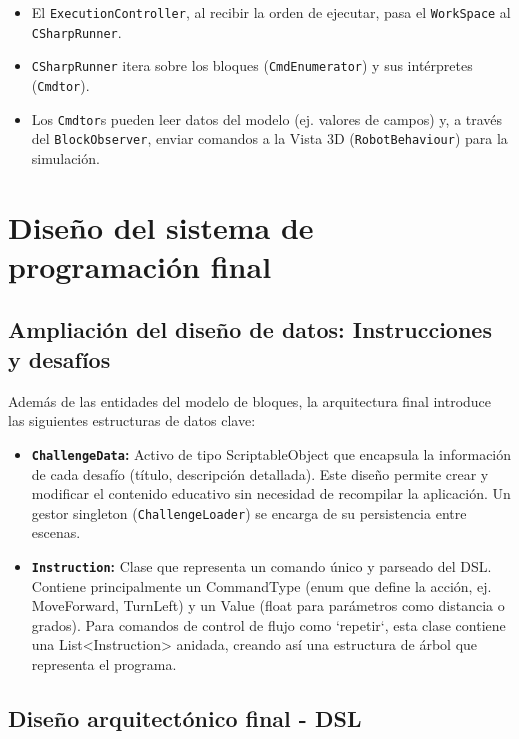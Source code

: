 \begin{enumerate}
	\begin{itemize}
		\item El \texttt{ExecutionController}, al recibir la orden de ejecutar, pasa el \texttt{WorkSpace} al \texttt{CSharpRunner}.
		\item \texttt{CSharpRunner} itera sobre los bloques (\texttt{CmdEnumerator}) y sus intérpretes (\texttt{Cmdtor}).
		\item Los \texttt{Cmdtor}s pueden leer datos del modelo (ej. valores de campos) y, a través del \texttt{BlockObserver}, enviar comandos a la Vista 3D (\texttt{RobotBehaviour}) para la simulación.
	\end{itemize}
\end{enumerate}

\section{Diseño del sistema de programación final}

\subsection{Ampliación del diseño de datos: Instrucciones y desafíos}
Además de las entidades del modelo de bloques, la arquitectura final introduce las siguientes estructuras de datos clave:

\begin{itemize}
	\item \textbf{\texttt{ChallengeData}:} Activo de tipo ScriptableObject que encapsula la información de cada desafío (título, descripción detallada). Este diseño permite crear y modificar el contenido educativo sin necesidad de recompilar la aplicación. Un gestor singleton (\texttt{ChallengeLoader}) se encarga de su persistencia entre escenas.
	
	\item \textbf{\texttt{Instruction}:} Clase que representa un comando único y parseado del DSL. Contiene principalmente un CommandType (enum que define la acción, ej. MoveForward, TurnLeft) y un Value (float para parámetros como distancia o grados). Para comandos de control de flujo como `repetir`, esta clase contiene una List<Instruction> anidada, creando así una estructura de árbol que representa el programa.
\end{itemize}

\subsection{Diseño arquitectónico final - DSL}

